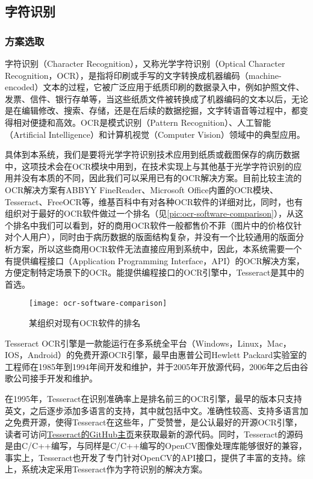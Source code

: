 \subsection{字符识别}
\subsubsection*{方案选取}
字符识别（Character Recognition），又称光学字符识别（Optical Character Recognition，OCR），是指将印刷或手写的文字转换成机器编码（machine-encoded）文本的过程，它被广泛应用于纸质印刷的数据录入中，例如护照文件、发票、信件、银行存单等，当这些纸质文件被转换成了机器编码的文本以后，无论是在编辑修改、搜索、存储，还是在后续的数据挖掘，文字转语音等过程中，都变得相对便捷和高效。OCR是模式识别（Pattern Recognition）、人工智能（Artificial Intelligence）和计算机视觉（Computer Vision）领域中的典型应用\citep{wiki:OCR}。

具体到本系统，我们是要将光学字符识别技术应用到纸质或截图保存的病历数据中，这项技术会在OCR模块中用到，在技术实现上与其他基于光学字符识别的应用并没有本质的不同，因此我们可以采用已有的OCR解决方案。目前比较主流的OCR解决方案有ABBYY FineReader、Microsoft Office内置的OCR模块、Tesseract、FreeOCR等，维基百科中有对各种OCR软件的详细对比\citep{wiki:OCRcomparison}，同时，也有组织对于最好的OCR软件做过一个排名（见\autoref{pic:ocr-software-comparison}），从这个排名中我们可以看到，好的商用OCR软件一般都售价不菲（图片中的价格仅针对个人用户），同时由于病历数据的版面结构复杂，并没有一个比较通用的版面分析方案，所以这些商用OCR软件无法直接应用到系统中，因此，本系统需要一个有提供编程接口（Application Programming Interface，API）的OCR解决方案，方便定制特定场景下的OCR。能提供编程接口的OCR引擎中，Tesseract是其中的首选。

\begin{figure}
	\centering
	\caption{某组织对现有OCR软件的排名}
	\texttt{[image: ocr-software-comparison]}
	\label{pic:ocr-software-comparison}
\end{figure}

Tesseract OCR引擎是一款能运行在多系统全平台（Windows，Linux，Mac，IOS，Android）的免费开源OCR引擎，最早由惠普公司Hewlett Packard实验室的工程师在1985年到1994年间开发和维护，并于2005年开放源代码，2006年之后由谷歌公司接手开发和维护\citep{wiki:Tesseract}。

在1995年，Tesseract在识别准确率上是排名前三的OCR引擎，最早的版本只支持英文，之后逐步添加多语言的支持，其中就包括中文。准确性较高、支持多语言加之免费开源，使得Tesseract在这些年，广受赞誉，是公认最好的开源OCR引擎，读者可访问\href{https://github.com/tesseract-ocr/tesseract}{Tesseract的GitHub主页}来获取最新的源代码。同时，Tesseract的源码是由C/C++编写，与同样是C/C++编写的OpenCV图像处理库能够很好的兼容，事实上，Tesseract也开发了专门针对OpenCV的API接口，提供了丰富的支持。综上，系统决定采用Tesseract作为字符识别的解决方案。

